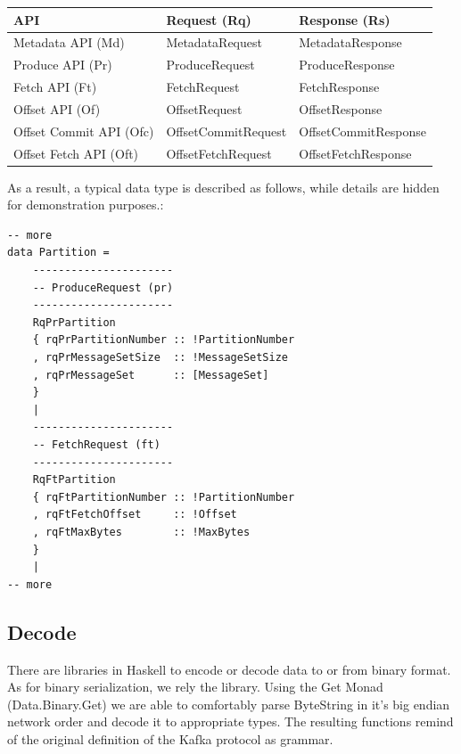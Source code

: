 \begin{table}[h]
\centering
\begin{tabular}{|l|l|l|}
\hline
\textbf{API}            & \textbf{Request (Rq)} & \textbf{Response (Rs)} \\ \hline
Metadata API (Md)       & MetadataRequest       & MetadataResponse       \\ \hline
Produce API (Pr)        & ProduceRequest        & ProduceResponse        \\ \hline
Fetch API (Ft)          & FetchRequest          & FetchResponse          \\ \hline
Offset API (Of)         & OffsetRequest         & OffsetResponse         \\ \hline
Offset Commit API (Ofc) & OffsetCommitRequest   & OffsetCommitResponse   \\ \hline
Offset Fetch API (Oft)  & OffsetFetchRequest    & OffsetFetchResponse    \\ \hline
\end{tabular}
\end{table}

As a result, a typical data type is described as follows, while details are
hidden for demonstration purposes.:

\begin{lstlisting}
-- more
data Partition =
    ----------------------
    -- ProduceRequest (pr)
    ----------------------
    RqPrPartition
    { rqPrPartitionNumber :: !PartitionNumber
    , rqPrMessageSetSize  :: !MessageSetSize
    , rqPrMessageSet      :: [MessageSet]
    }
    |
    ----------------------
    -- FetchRequest (ft)
    ----------------------
    RqFtPartition
    { rqFtPartitionNumber :: !PartitionNumber
    , rqFtFetchOffset     :: !Offset
    , rqFtMaxBytes        :: !MaxBytes
    }
    |
-- more
\end{lstlisting}

\subsection{Decode}
There are libraries in Haskell to encode or decode data to or from binary format. 
As for binary serialization, we rely the
library. Using the Get Monad (Data.Binary.Get) we are able to comfortably parse
ByteString in it's big endian network order and decode it to appropriate types.
The resulting functions remind of the original definition of the Kafka protocol
as grammar. 

